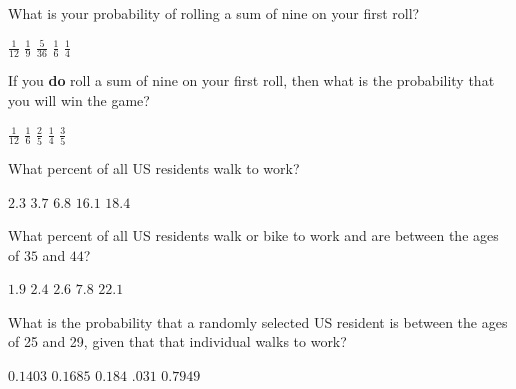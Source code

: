 \documentclass[answers,12pt]{exam}
\begin{document}
\begin{questions}
\question
What is your probability of rolling a sum
of nine on your first roll?\\
\begin{oneparchoices}
\choice $\frac{1}{12}$ %
\correctchoice $\frac{1}{9}$
\choice $\frac{5}{36}$
\choice $\frac{1}{6}$
\choice $\frac{1}{4}$ %
\end{oneparchoices}

\question\label{LastCraps}
If you {\bf do} roll a sum of nine on your first roll,
then what is the probability that you will win the game?\\
\begin{oneparchoices}
\choice $\frac{1}{12}$ %
\choice $\frac{1}{6}$  %
\correctchoice $\frac{2}{5}$  %
\choice $\frac{1}{4}$  %
\choice $\frac{3}{5}$  %
\end{oneparchoices}


\question\label{FirstWalk}
What percent of all US residents walk to work?\\
\begin{oneparchoices}
\choice $2.3$ %
\choice $3.7$ %
\choice $6.8$ %
\choice $16.1$ %
\correctchoice $18.4$
\end{oneparchoices}
\newpage

\question
What percent of all US residents walk or bike to work
and are between the ages of $35$ and $44$?\\
\begin{oneparchoices}
\choice $1.9$ %
\correctchoice $2.4$
\choice $2.6$ %
\choice $7.8$ %
\choice $22.1$ %
\end{oneparchoices}

\question
What is the probability that a randomly selected US resident
is between the ages of 25 and 29, given that that individual
walks to work?\\
\begin{oneparchoices}
\choice $0.1403$ %
\correctchoice $0.1685$
\choice $0.184$ %
\choice $.031$ %
\choice $0.7949$ %
\end{oneparchoices}


\end{questions}
\end{document}
